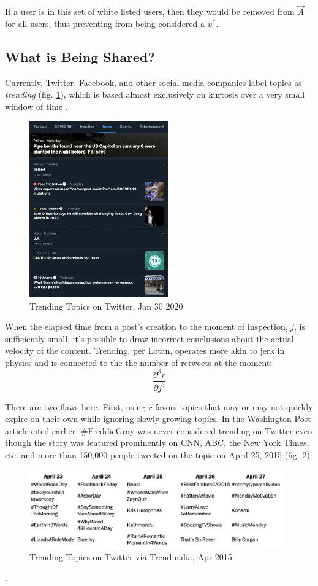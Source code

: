 \documentclass[preprint,review,12pt]{elsarticle}
\begin{document}
If a user is in this set of white listed users, then they would be removed from $\vec{A}$ for all users, thus preventing from being considered a $u^*$.

\subsection{What is Being Shared?}
\label{sec: what is being shared}
Currently, Twitter, Facebook, and other social media companies label topics as \textit{trending} (fig. \ref{img:Trending Topics}), which is based almost exclusively on kurtosis over a very small window of time \cite{dewey2015freddie,lotan2015freddie}. 

\begin{figure}[htp]
    \centering
    \includegraphics[width=6cm]{Twitter Trending.png}
    \caption{Trending Topics on Twitter, Jan 30 2020}
    \label{img:Trending Topics}
\end{figure}

When the elapsed time from a post's creation to the moment of inspection, $j$, is sufficiently small, it's possible to draw incorrect conclusions about the actual velocity of the content. Trending, per Lotan, operates more akin to jerk in physics and is connected to the the number of retweets at the moment: 
\[
    \frac{\partial^3 r}{\partial j^3}
\]

There are two flaws here. First, using $r$ favors topics that may or may not quickly expire on their own while ignoring slowly growing topics. In the Washington Post article cited earlier, \#FreddieGray was never considered trending on Twitter even though the story was featured prominently on CNN, ABC, the New York Times, etc. and more than 150,000 people tweeted on the topic on April 25, 2015 (fig. \ref{img:Trendinalia 2015})
\begin{figure}[htp]
    \centering
    \includegraphics[width=11cm]{Trendinalia Apr, 2015.png}
    \caption{Trending Topics on Twitter via Trendinalia, Apr 2015}
    \label{img:Trendinalia 2015}
\end{figure}
. 
\end{document}
